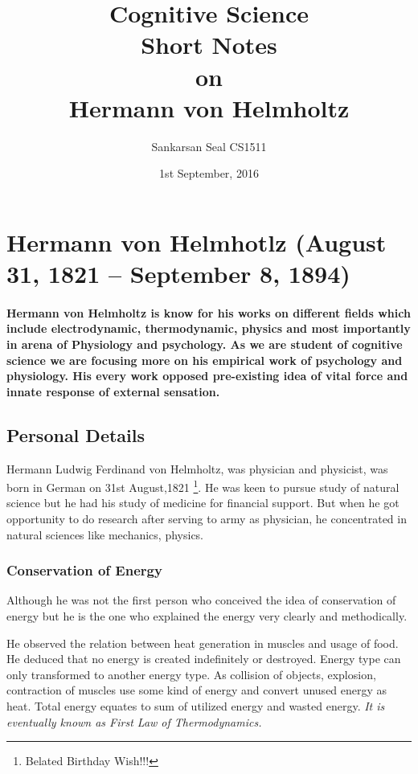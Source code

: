\documentclass[11pt]{article}
\begin{document}
\title{Cognitive Science\\ Short Notes\\ on\\ Hermann von Helmholtz}
\author{Sankarsan Seal CS1511}
\date{1st September, 2016}
\maketitle

\section{Hermann von Helmhotlz (August 31, 1821  – September 8, 1894)}
\paragraph{Hermann von Helmholtz is know for his works on different fields which include electrodynamic, thermodynamic, physics and most importantly in arena of Physiology and psychology. As we are student of cognitive science we are focusing more on his empirical work of psychology and physiology. His every work opposed pre-existing idea of vital force and innate response of external sensation.}

\subsection{Personal Details}
Hermann Ludwig Ferdinand von Helmholtz, was physician and physicist, was born in German on 31st August,1821 \footnote{Belated Birthday Wish!!!}. He was keen to pursue study of natural science but he had his study of medicine for financial support. But when he got opportunity to do research after serving to army as physician, he concentrated in natural sciences like mechanics, physics.

\subsubsection{Conservation of Energy}
Although he was not the first person who conceived the idea of conservation of energy but he is the one who explained the energy very clearly and methodically.

He observed the relation between heat generation in muscles and  usage of food. He deduced that no energy is created indefinitely or destroyed. Energy type can only transformed to another energy type. As collision of objects, explosion, contraction of muscles use some kind of energy and convert unused energy as heat. Total energy equates to  sum of utilized energy and wasted energy. \textit{It is eventually known as First Law of Thermodynamics.}
\end{document}
